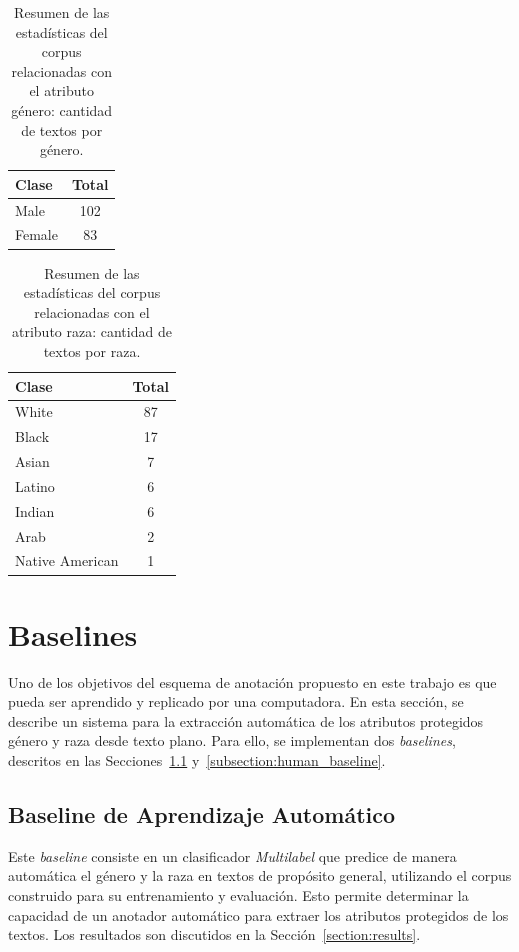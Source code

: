 \begin{table}[htpb]
    \centering
        \begin{tabular}{lc}
        \toprule
          \textbf{Clase} & \textbf{Total} \\
        \midrule
                    Male & 102 \\
                  Female & 83 \\

        \bottomrule
        \end{tabular}
    \caption{Resumen de las estad\'isticas del corpus relacionadas con el atributo g\'enero: cantidad de textos por g\'enero.}
    \label{table:stats_gen}
\end{table}

\begin{table}[htpb]
    \centering
        \begin{tabular}{lc}
        \toprule
            \textbf{Clase} & \textbf{Total} \\
        \midrule
                     White & 87 \\
                     Black & 17 \\
                     Asian & 7 \\
                    Latino & 6 \\
                    Indian & 6 \\
                      Arab & 2 \\
           Native American & 1 \\

        \bottomrule
        \end{tabular}
    \caption{Resumen de las estad\'isticas del corpus relacionadas con el atributo raza: cantidad de textos por raza.}
    \label{table:stats_race}
\end{table}

\section{Baselines}\label{section:baseline}
Uno de los objetivos del esquema de anotaci\'on propuesto en este trabajo es que pueda ser aprendido 
y replicado por una computadora. En esta secci\'on, se describe un sistema para la extracci\'on
autom\'atica de los atributos protegidos g\'enero y raza desde texto plano. Para ello, se 
implementan dos \emph{baselines}, descritos en las Secciones~\ref{subsection:ml_baseline} 
y~\ref{subsection:human_baseline}.

\subsection{Baseline de Aprendizaje Autom\'atico}\label{subsection:ml_baseline}
Este \emph{baseline} consiste en un clasificador \emph{Multilabel}  que predice 
de manera autom\'atica el g\'enero y la raza en textos de prop\'osito general, utilizando el corpus construido 
para su entrenamiento y evaluaci\'on. Esto permite determinar la capacidad de un anotador autom\'atico para 
extraer los atributos protegidos de los textos. Los resultados son discutidos en la Secci\'on~\ref{section:results}.

